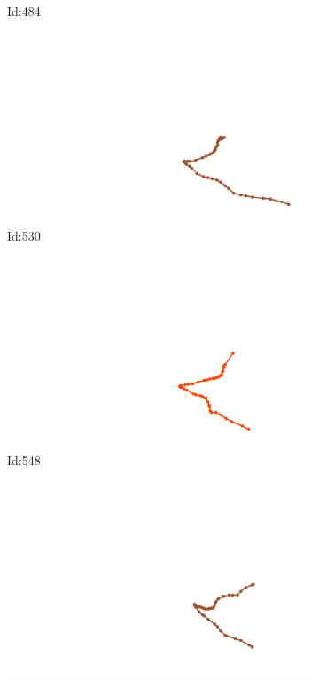 \documentclass[12pt,twoside]{report}
\begin{document}
\begin{figure}
\begin{subfigure}[b]{0.20\textwidth}
\caption{Id:484}
\end{subfigure}
\begin{subfigure}[b]{0.20\textwidth}
\centering
\includegraphics[width=\textwidth]{../trajectories/530.png}
\caption{Id:530}
\end{subfigure}
\begin{subfigure}[b]{0.20\textwidth}
\centering
\includegraphics[width=\textwidth]{../trajectories/548.png}
\caption{Id:548}
\end{subfigure}
\begin{subfigure}[b]{0.20\textwidth}
\centering
\includegraphics[width=\textwidth]{../trajectories/558.png}

\end{subfigure}
\end{figure}
\end{document}

